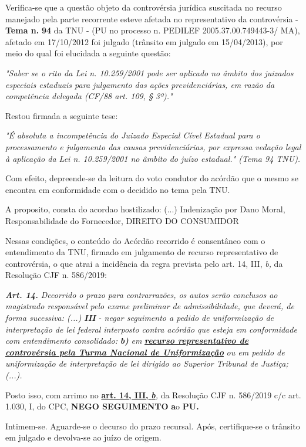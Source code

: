 \documentclass[12pt]{article}
\begin{document}
\justifying
\noindent Verifica-se que a questão objeto da controvérsia jurídica suscitada no recurso manejado pela parte recorrente esteve afetada no representativo da controvérsia - \textbf{Tema n. }\textbf{94} da TNU - (PU no processo n. PEDILEF 2005.37.00.749443-3/ MA),  afetado em 17/10/2012 foi julgado (trânsito em julgado em 15/04/2013), por meio do qual foi elucidada a seguinte questão:

\noindent \textit{"Saber se o rito da Lei n. 10.259/2001 pode ser aplicado no âmbito dos juizados especiais estaduais para julgamento das ações previdenciárias, em razão da competência delegada (CF/88 art. 109, § 3º)."}

\noindent Restou firmada a seguinte tese:

\noindent \textit{"É absoluta a incompetência do Juizado Especial Cível Estadual para o processamento e julgamento das causas previdenciárias, por expressa vedação legal à aplicação da Lei n. 10.259/2001 no âmbito do juízo estadual." (Tema 94 TNU).}

\noindent Com efeito, depreende-se da leitura do voto condutor do acórdão que o mesmo se encontra em conformidade com o decidido no  tema pela TNU.

\noindent A proposito, consta do acordao hostilizado: (...) Indenização por Dano Moral, Responsabilidade do Fornecedor, DIREITO DO CONSUMIDOR

\noindent Nessas condições, o conteúdo do Acórdão recorrido é consentâneo com o entendimento da TNU, firmado em julgamento de recurso representativo de controvérsia, o que atrai a incidência da regra prevista pelo art. 14, III, \textit{b,} da Resolução CJF n. 586/2019:

\noindent \textit{\textbf{Art. 14.}}\textit{ Decorrido o prazo para contrarrazões, os autos serão conclusos ao magistrado responsável pelo exame preliminar de admissibilidade, que deverá, de forma sucessiva: (...) }\textit{\textbf{III }}\textit{- negar seguimento a pedido de uniformização de interpretação de lei federal interposto contra acórdão que esteja em conformidade com entendimento consolidado: }\textit{\textbf{b)}}\textit{ em }\uline{\textit{\textbf{recurso representativo de controvérsia pela Turma Nacional de Uniformização}}}\textit{ ou em pedido de uniformização de interpretação de lei dirigido ao Superior Tribunal de Justiça;(...).}

\noindent Posto isso, com arrimo no \uline{\textbf{art. 14, III, }}\uline{\textit{\textbf{b}}}\textit{,} da Resolução CJF n. 586/2019 c/c art. 1.030, I, do CPC, \textbf{NEGO SEGUIMENTO }\textbf{a}o\textbf{ PU}\textbf{.}

\noindent Intimem-se. Aguarde-se o decurso do prazo recursal. Após, certifique-se o trânsito em julgado e devolva-se ao juízo de origem.
\end{document}
